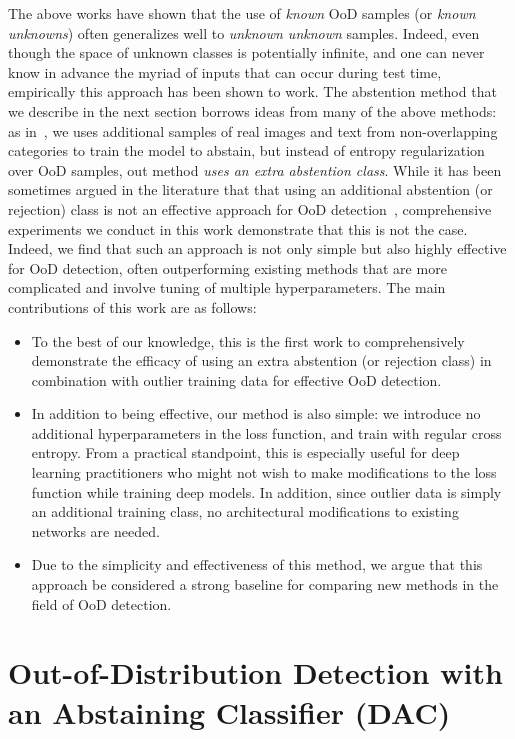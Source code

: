 \documentclass[accepted]{uai2021} \pdfoutput=1
\begin{document}
The above works have shown that the use of \textit{known} OoD samples (or \textit{known unknowns}) often generalizes well to \textit{unknown unknown} samples. Indeed,  even though the space of unknown classes is potentially infinite, and one can never know in advance the myriad of inputs that can occur during test time, empirically this approach  has been shown to work. 
The abstention method that we describe in the next section borrows ideas from many of the above methods: as in~\cite{hendrycks2018deep}, we uses additional samples of real images and text from non-overlapping categories to train the model to abstain, but instead of entropy regularization over OoD samples, out method  \textit{uses an extra abstention class}.
While it has been sometimes argued in the literature that that using an additional abstention (or rejection) class is not an effective approach for OoD detection~\cite{dhamija2018reducing,lee2017training}, comprehensive experiments we conduct in this work demonstrate that this is not the case. Indeed,  we find that such an approach is not only simple but also highly effective for OoD detection, often outperforming existing methods that are more complicated and involve tuning of multiple hyperparameters.  The main contributions of this work are as follows:
\begin{itemize}
		\item To the best of our knowledge, this is the first work to comprehensively demonstrate the efficacy of using an extra abstention (or rejection class) in combination with outlier training data for effective OoD detection.
		\item In addition to being effective, our method is also simple: we introduce no additional hyperparameters in the loss function, and train with regular cross entropy. From a practical standpoint, this is especially useful for deep learning practitioners who might not wish to make modifications to the loss function while training deep models. In addition, since outlier data is simply an additional training class, no architectural modifications to existing networks are needed.
		\item Due to the simplicity and effectiveness of this method, we argue that this approach  be considered a strong baseline for comparing new methods in the field of OoD detection.
	\end{itemize}


\section{Out-of-Distribution Detection with an Abstaining Classifier (DAC)}
\label{sec:openset_det}
\end{document}
